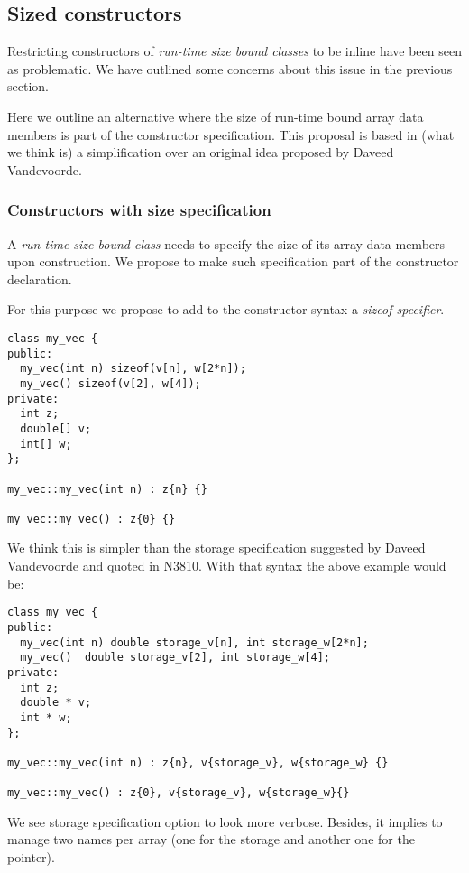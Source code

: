 \subsection{Sized constructors}

Restricting constructors of \emph{run-time size bound classes} to be inline have
been seen as problematic. We have outlined some concerns about this issue in the
previous section.

Here we outline an alternative where the size of run-time bound array data
members is part of the constructor specification. This proposal is based in
(what we think is) a simplification over an original idea proposed by Daveed
Vandevoorde.

\subsubsection{Constructors with size specification}

A \emph{run-time size bound class} needs to specify the size of its array data
members upon construction. We propose to make such specification part of the
constructor declaration.

For this purpose we propose to add to the constructor syntax a
\emph{sizeof-specifier}.

\begin{lstlisting}
class my_vec {
public:
  my_vec(int n) sizeof(v[n], w[2*n]);
  my_vec() sizeof(v[2], w[4]);
private:
  int z;
  double[] v;
  int[] w;
};

my_vec::my_vec(int n) : z{n} {}

my_vec::my_vec() : z{0} {}
\end{lstlisting}

We think this is simpler than the storage specification suggested by Daveed
Vandevoorde and quoted in N3810. With that syntax the above example would be:

\begin{lstlisting}
class my_vec {
public:
  my_vec(int n) double storage_v[n], int storage_w[2*n];
  my_vec()  double storage_v[2], int storage_w[4];
private:
  int z;
  double * v;
  int * w;
};

my_vec::my_vec(int n) : z{n}, v{storage_v}, w{storage_w} {}

my_vec::my_vec() : z{0}, v{storage_v}, w{storage_w}{}
\end{lstlisting}

We see storage specification option to look more verbose. Besides, it implies to
manage two names per array (one for the storage and another one for the pointer).

